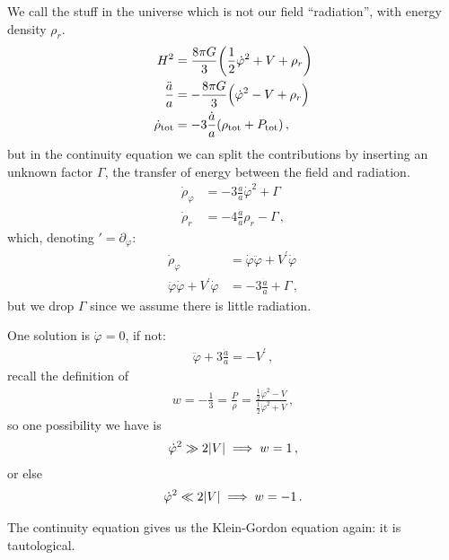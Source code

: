 \documentclass[main.tex]{subfiles}
\begin{document}
We call the stuff in the universe which is not our field ``radiation'', with energy density \(\rho_r\). 
%
\begin{subequations}    
\begin{align}
    H^2 &= \frac{8 \pi G }{3} \qty(\frac{1}{2} \dot{\varphi }^2 + V + \rho_r) \\
    \frac{\ddot{a}}{a} &= - \frac{8 \pi G }{3} \qty(\dot{\varphi }^2 - V + \rho_r) \\
    \dot{\rho} _{\text{tot}} &= - 3 \frac{\dot{a}}{a} \qty(\rho _{\text{tot}} + P _{\text{tot}})
    \,,
\end{align}
\end{subequations}
%
but in the continuity equation we can split the contributions by inserting an unknown factor \(\Gamma \), the transfer of energy between the field and radiation. 
%
\begin{align}
  \dot{\rho} _\varphi &=  - 3 \frac{\dot{a}}{a} \dot{\varphi }^2 + \Gamma \\  
  \dot{\rho} _r &=  - 4 \frac{\dot{a}}{a} \rho_r - \Gamma  
\,,
\end{align}
%
which, denoting \(' = \partial_\varphi \): 
%
\begin{align}
  \dot{\rho }_\varphi &= \dot{\varphi } \ddot{\varphi } + V^{\prime } \dot{\varphi } \\
  \ddot{\varphi} \dot{\varphi } + V^{\prime } \dot{\varphi } &= -3 \frac{\dot{a}}{a} + \Gamma 
\,,
\end{align}
%
but we drop \(\Gamma \) since we assume there is little radiation.

One solution is \(\dot{\varphi } =0\), if not: 
%
\begin{align}
  \ddot{\varphi } + 3 \frac{\dot{a}}{a} = - V^{\prime }
\,,
\end{align}
%
recall the definition of
%
\begin{align}
  w = - \frac{1}{3} = \frac{P}{\rho }
  = \frac{\frac{1}{2} \dot{\varphi }^2 - V}{\frac{1}{2} \dot{\varphi }^2 + V}
\,,
\end{align}
%
so one possibility we have is 
%
\begin{align}
  \dot{\varphi }^2 \gg 2 \abs{V} \implies w = 1
\,,
\end{align}
%
or else 
%
\begin{align}
\dot{\varphi }^2 \ll 2 \abs{V} \implies w = - 1
\,.
\end{align}

The continuity equation gives us the Klein-Gordon equation again: it is tautological.
\end{document}
